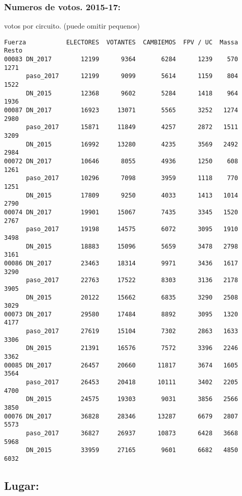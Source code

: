 \documentclass[11pt]{article}
\begin{document}
    \hypertarget{numeros-de-votos.-2015-17}{%
\subsubsection{Numeros de votos.
2015-17:}\label{numeros-de-votos.-2015-17}}

    
    votos por circuito. (puede omitir pequenos)

    
    
    \begin{verbatim}
Fuerza           ELECTORES  VOTANTES  CAMBIEMOS  FPV / UC  Massa  Resto
00083 DN_2017        12199      9364       6284      1239    570   1271
      paso_2017      12199      9099       5614      1159    804   1522
      DN_2015        12368      9602       5284      1418    964   1936
00087 DN_2017        16923     13071       5565      3252   1274   2980
      paso_2017      15871     11849       4257      2872   1511   3209
      DN_2015        16992     13280       4235      3569   2492   2984
00072 DN_2017        10646      8055       4936      1250    608   1261
      paso_2017      10296      7098       3959      1118    770   1251
      DN_2015        17809      9250       4033      1413   1014   2790
00074 DN_2017        19901     15067       7435      3345   1520   2767
      paso_2017      19198     14575       6072      3095   1910   3498
      DN_2015        18883     15096       5659      3478   2798   3161
00086 DN_2017        23463     18314       9971      3436   1617   3290
      paso_2017      22763     17522       8303      3136   2178   3905
      DN_2015        20122     15662       6835      3290   2508   3029
00073 DN_2017        29580     17484       8892      3095   1320   4177
      paso_2017      27619     15104       7302      2863   1633   3306
      DN_2015        21391     16576       7572      3396   2246   3362
00085 DN_2017        26457     20660      11817      3674   1605   3564
      paso_2017      26453     20418      10111      3402   2205   4700
      DN_2015        24575     19303       9031      3856   2566   3850
00076 DN_2017        36828     28346      13287      6679   2807   5573
      paso_2017      36827     26937      10873      6428   3668   5968
      DN_2015        33959     27165       9601      6682   4850   6032
    \end{verbatim}

    
    \hypertarget{lugar}{%
\subsection{Lugar:}\label{lugar}}
\end{document}
